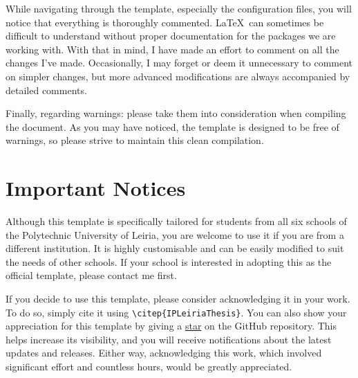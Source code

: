 {While navigating through the template, especially the configuration files, you will notice that everything is thoroughly commented. \LaTeX~can sometimes be difficult to understand without proper documentation for the packages we are working with. With that in mind, I have made an effort to comment on all the changes I've made. Occasionally, I may forget or deem it unnecessary to comment on simpler changes, but more advanced modifications are always accompanied by detailed comments.

Finally, regarding warnings: please take them into consideration when compiling the document. As you may have noticed, the template is designed to be free of warnings, so please strive to maintain this clean compilation.

\section{Important Notices}
Although this template is specifically tailored for students from all six schools of the Polytechnic University of Leiria, you are welcome to use it if you are from a different institution. It is highly customisable and can be easily modified to suit the needs of other schools. If your school is interested in adopting this as the official template, please contact me first. 

If you decide to use this template, please consider acknowledging it in your work. To do so, simply cite it using \verb|\citep{IPLeiriaThesis}|. You can also show your appreciation for this template by giving a \href{https://github.com/joseareia/ipleiria-thesis/stargazers}{star} on the GitHub repository. This helps increase its visibility, and you will receive notifications about the latest updates and releases. Either way, acknowledging this work, which involved significant effort and countless hours, would be greatly appreciated.




}